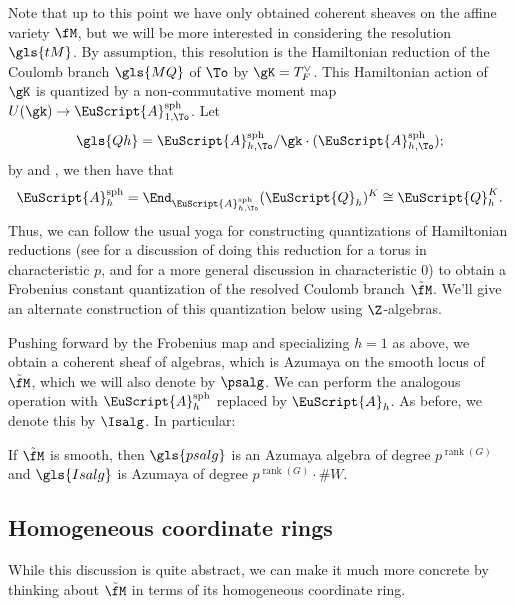 Note that up to this point we have only obtained coherent sheaves on the affine variety $\fM$, but we will be more interested in considering the resolution $\gls{tM}$.  By assumption, this resolution is the Hamiltonian reduction of the  Coulomb branch $\gls{MQ}$ of $\To$ by $\gK=T_F^\vee$.  This Hamiltonian action of $\gK$ is quantized by a non-commutative moment map $U(\gk)\to \EuScript{A}_{1,\To}^{\operatorname{sph}}$.  Let \[\gls{Qh}=\EuScript{A}_{h,\To}^{\operatorname{sph}}/\gk \cdot (\EuScript{A}_{h,\To}^{\operatorname{sph}});\] by \cite[3(vii)(d)]{BFN} and \cite[Lem. 3.12]{WebSD}, we then have that
\begin{equation}
\EuScript{A}_{h}^{\operatorname{sph}}=\End_{\EuScript{A}_{h,\To}^{\operatorname{sph}} }(\EuScript{Q}_h)^K\cong \EuScript{Q}_h^K.\label{eq:qham}
\end{equation}
Thus, we can follow the usual yoga for constructing quantizations of Hamiltonian reductions (see \cite[4.3]{Stadnik} for a discussion of doing this reduction for a torus in characteristic $p$, and \cite[\S 2.5]{KR07} for a more general discussion in characteristic $0$)  to obtain a Frobenius constant quantization of the
resolved Coulomb branch $\tilde{\fM}$.  We'll give an alternate construction of this quantization below using $\Z$-algebras.

Pushing forward by the
Frobenius map and specializing $h=1$ as above, we obtain a coherent
sheaf of algebras, which is Azumaya on the smooth locus of
$\tilde{\fM}$, which we will also denote by $\psalg$.  We can perform the analogous operation with $\EuScript{A}_h ^{\operatorname{sph}}$ replaced by  $\EuScript{A}_h$.  As before, we denote this by $\Isalg$.
In particular: \begin{lemma}
  If $\tilde{\fM}$ is smooth, then $\gls{psalg}$ is an Azumaya algebra of degree $p^{\operatorname{rank}(G)}$ and $\gls{Isalg}$ is Azumaya of degree $p^{\operatorname{rank}(G)}\cdot \#W$.  
\end{lemma}



\subsection{Homogeneous coordinate rings}  
While this discussion is quite abstract, we can make it much more concrete by thinking about $\tilde{\fM}$ in terms of its homogeneous coordinate ring.

